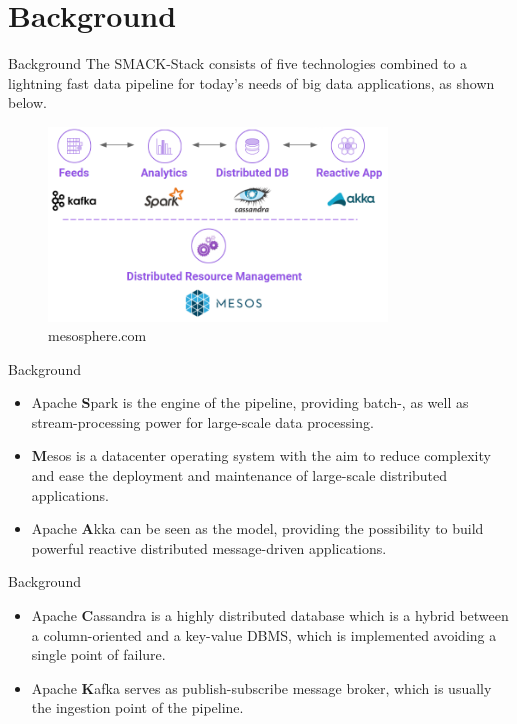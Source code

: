 \documentclass[10pt]{beamer}
\begin{document}
\section{Background}

\begin{frame}{Background}
		The SMACK-Stack consists of five technologies combined to a lightning fast data pipeline for today's needs of big data applications, as shown below.\\
        \hfill
		\begin{figure}[!htbp]
  			\centering
  			\includegraphics[keepaspectratio=true,width=9cm]{img/smack_stack}
                \caption{mesosphere.com \cite{mesosphere}}
  			\label{fig:smack_stack}
		\end{figure}
\end{frame}

\begin{frame}{Background}
		\begin{itemize}
 		 \item Apache \textbf{S}park is the engine of the pipeline, providing batch-, as well as stream-processing power for large-scale data processing.
   		 \item \textbf{M}esos is a datacenter operating system with the aim to reduce complexity and ease the deployment and maintenance of large-scale distributed applications.
   		 \item Apache \textbf{A}kka can be seen as the model, providing the possibility to build powerful reactive distributed message-driven applications.
		\end{itemize}
\end{frame}

\begin{frame}{Background}
		\begin{itemize}
   		 \item Apache \textbf{C}assandra is a highly distributed database which is a hybrid between a column-oriented and a key-value DBMS, which is implemented avoiding a single point of failure.
   		 \item Apache \textbf{K}afka serves as publish-subscribe message broker, which is usually the ingestion point of the pipeline.
		\end{itemize}
\end{frame}
\end{document}

